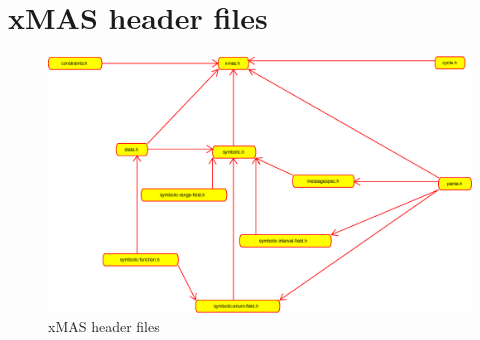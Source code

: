 \documentclass[a4paper,11pt]{article}
\begin{document}
\newpage

\appendix

\section{xMAS header files}

\begin{figure}[h]
  \includegraphics[width=\textwidth]{images/file-dependencies.eps}
  \caption{xMAS header files}
  \label{fig:xmas-headers}
\end{figure}
\end{document}
